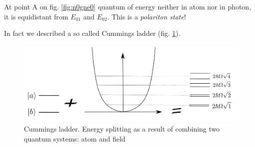 At point A on fig. \ref{fig:n0gne0} quantum of energy neither in atom nor in photon, it is equidistant from $E_{01}$ and $E_{02}$. This is a \textit{polariton state}!

In fact we described a so called Cummings ladder (fig. \ref{fig:lad}).
\begin{figure}
	\centering
	\includegraphics[width=0.6\linewidth]{fig/L6/lad}
	\caption{Cummings ladder. Energy splitting as a result of combining two quantum systems: atom and field}
	\label{fig:lad}
\end{figure}
